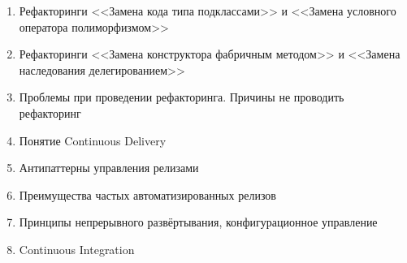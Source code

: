 \documentclass[a5paper]{article}
\begin{document}
\begin{enumerate}
    \item Рефакторинги <<Замена кода типа подклассами>> и <<Замена условного оператора полиморфизмом>>
    \item Рефакторинги <<Замена конструктора фабричным методом>> и <<Замена наследования делегированием>>
    \item Проблемы при проведении рефакторинга. Причины не проводить рефакторинг
    \item Понятие Continuous Delivery
    \item Антипаттерны управления релизами
    \item Преимущества частых автоматизированных релизов
    \item Принципы непрерывного развёртывания, конфигурационное управление
    \item Continuous Integration
\end{enumerate}
\end{document}
